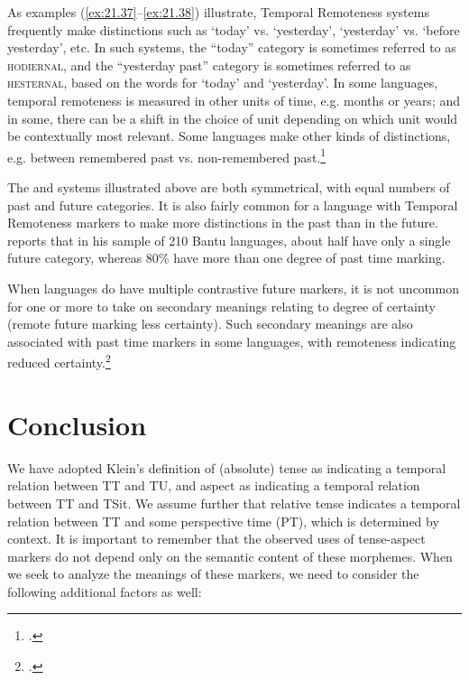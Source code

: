 As examples (\ref{ex:21.37}--\ref{ex:21.38}) illustrate, Temporal Remoteness systems frequently make distinctions such as ‘today’ vs. ‘yesterday’, ‘yesterday’ vs. ‘before yesterday’, etc. In such systems, the “today” category is sometimes referred to as \textsc{hodiernal}, and the “yesterday past” category is sometimes referred to as \textsc{hesternal}, based on the  words for ‘today’ and ‘yesterday’. In some languages, temporal remoteness is measured in other units of time, e.g. months or years; and in some, there can be a shift in the choice of unit depending on which unit would be contextually most relevant. Some languages make other kinds of distinctions, e.g. between remembered past vs. non-remembered past.\footnote{\citet{Botne2012}.}



The  and  systems illustrated above are both symmetrical, with equal numbers of past and future categories. It is also fairly common for a language with Temporal Remoteness markers to make more distinctions in the past than in the future. \citet{Nurse2008} reports that in his sample of 210 {Bantu} languages, about half have only a single future category, whereas 80\% have more than one degree of past time marking. 



When languages do have multiple contrastive future markers, it is not uncommon for one or more to take on secondary meanings relating to degree of certainty (remote future marking less certainty). Such secondary meanings are also associated with past time markers in some languages, with remoteness indicating reduced certainty.\footnote{\citet{Botne2012,Nurse2008}.}


\section{Conclusion}\label{sec:21.6}

We have adopted Klein’s definition of (absolute) tense as indicating a temporal relation between TT and TU, and aspect as indicating a temporal relation between TT and TSit. We assume further that relative tense indicates a temporal relation between TT and some perspective time (PT), which is determined by context. It is important to remember that the observed uses of tense-aspect markers do not depend only on the semantic content of these morphemes. When we seek to analyze the meanings of these markers, we need to consider the following additional factors as well:


